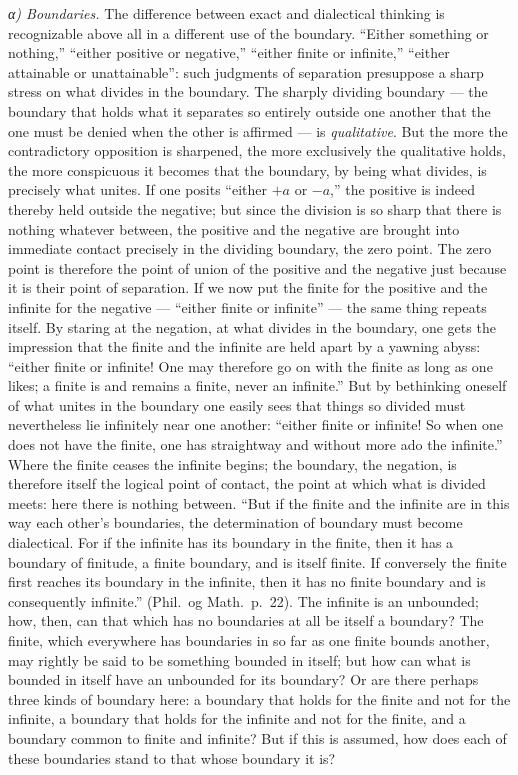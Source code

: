 \documentclass[12pt,a4paper]{book}
\begin{document}
\emph{α) Boundaries.} The difference between exact and dialectical thinking is
recognizable above all in a different use of the boundary. ``Either something
or nothing,'' ``either positive or negative,'' ``either finite or infinite,''
``either attainable or unattainable'': such judgments of separation presuppose
a sharp stress on what divides in the boundary. The sharply dividing boundary
--- the boundary that holds what it separates so entirely outside one another
that the one must be denied when the other is affirmed --- is
\emph{qualitative}. But the more the contradictory opposition is sharpened, the
more exclusively the qualitative holds, the more conspicuous it becomes that
the boundary, by being what divides, is precisely what unites. If one posits
``either $+a$ or $-a$,'' the positive is indeed thereby held outside the
negative; but since the division is so sharp that there is nothing whatever
between, the positive and the negative are brought into immediate contact
precisely in the dividing boundary, the zero point. The zero point is therefore
the point of union of the positive and the negative just because it is their
point of separation. If we now put the finite for the positive and the infinite
for the negative --- ``either finite or infinite'' --- the same thing repeats
itself. By staring at the negation, at what divides in the boundary, one gets
the impression
that the finite and the infinite are held apart by a yawning abyss: ``either
finite or infinite! One may therefore go on with the finite as long as one
likes; a finite is and remains a finite, never an infinite.'' But by
bethinking oneself of what unites in the boundary one easily sees that things
so divided must nevertheless lie infinitely near one another: ``either finite
or infinite! So when one does not have the finite, one has straightway and
without more ado the infinite.'' Where the finite ceases the infinite begins;
the boundary, the negation, is therefore itself the logical point of contact,
the point at which what is divided meets: here there is nothing between. ``But
if the finite and the infinite are in this way each other's boundaries, the
determination of boundary must become dialectical. For if the infinite has its
boundary in the finite, then it has a boundary of finitude, a finite boundary,
and is itself finite. If conversely the finite first reaches its boundary in
the infinite, then it has no finite boundary and is consequently infinite.''
(Phil.\ og Math.\ p.~22). The infinite is an unbounded; how, then, can that
which has no boundaries at all be itself a boundary? The finite, which
everywhere has boundaries in so far as one finite bounds another, may rightly
be said to be something bounded in itself; but how can what is bounded in
itself have an unbounded for its boundary? Or are there perhaps three kinds of
boundary here: a boundary that holds for the finite and not for the infinite, a
boundary that holds for the infinite and not for the finite, and a boundary
common to finite and infinite? But if this is assumed, how does each of these
boundaries stand to that whose boundary it is?
\end{document}
